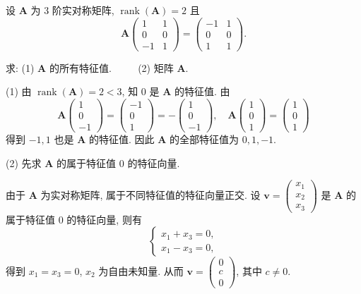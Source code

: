\documentclass[../../main.tex]{subfiles}
\begin{document}
\begin{example}
设 $\boldsymbol{A}$ 为 3 阶实对称矩阵, $\operatorname{rank}(\boldsymbol{A}) = 2$ 且
$$
\boldsymbol{A}\begin{pmatrix} 1 & 1 \\ 0 & 0 \\ -1 & 1 \end{pmatrix} = \begin{pmatrix} -1 & 1 \\ 0 & 0 \\ 1 & 1 \end{pmatrix}.
$$

求: (1) $\boldsymbol{A}$ 的所有特征值.
$\quad \quad$
(2) 矩阵 $\boldsymbol{A}$.
\end{example}
\begin{solution}
(1) 由 $\operatorname{rank}(\boldsymbol{A}) = 2 < 3$, 知 $0$ 是 $\boldsymbol{A}$ 的特征值. 由
$$
\boldsymbol{A}\begin{pmatrix} 1 \\ 0 \\ -1 \end{pmatrix} = \begin{pmatrix} -1 \\ 0 \\ 1 \end{pmatrix} = -\begin{pmatrix} 1 \\ 0 \\ -1 \end{pmatrix}, \quad \boldsymbol{A}\begin{pmatrix} 1 \\ 0 \\ 1 \end{pmatrix} = \begin{pmatrix} 1 \\ 0 \\ 1 \end{pmatrix}
$$
得到 $-1, 1$ 也是 $\boldsymbol{A}$ 的特征值. 因此 $\boldsymbol{A}$ 的全部特征值为 $0, 1, -1$.

(2) 先求 $\boldsymbol{A}$ 的属于特征值 $0$ 的特征向量.

由于 $\boldsymbol{A}$ 为实对称矩阵, 属于不同特征值的特征向量正交. 设 $\boldsymbol{v} = \begin{pmatrix} x_1 \\ x_2 \\ x_3 \end{pmatrix}$ 是 $\boldsymbol{A}$ 的属于特征值 $0$ 的特征向量, 则有
$$
\begin{cases}
x_1 + x_3 = 0, \\
x_1 - x_3 = 0,
\end{cases}
$$
得到 $x_1 = x_3 = 0$, $x_2$ 为自由未知量. 从而 $\boldsymbol{v} = \begin{pmatrix} 0 \\ c \\ 0 \end{pmatrix}$, 其中 $c \neq 0$.


\end{solution}
\end{document}
